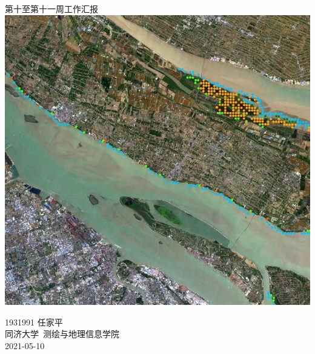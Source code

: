 \documentclass[a4paper, 12pt]{article}
\begin{document}
\begin{center}
    {\Huge 
        第十至第十一周工作汇报}\\[20pt]
    
    \includegraphics[scale=0.6]{pic/cover.jpg}  

    {\Large 
        1931991 任家平\\[12pt]
        同济大学~测绘与地理信息学院\\[12pt]
        2021-05-10}
\end{center}
\thispagestyle{empty}



\newpage
{}
\tableofcontents
\newpage
{}




\newpage
\nocite{*}


\end{document}
